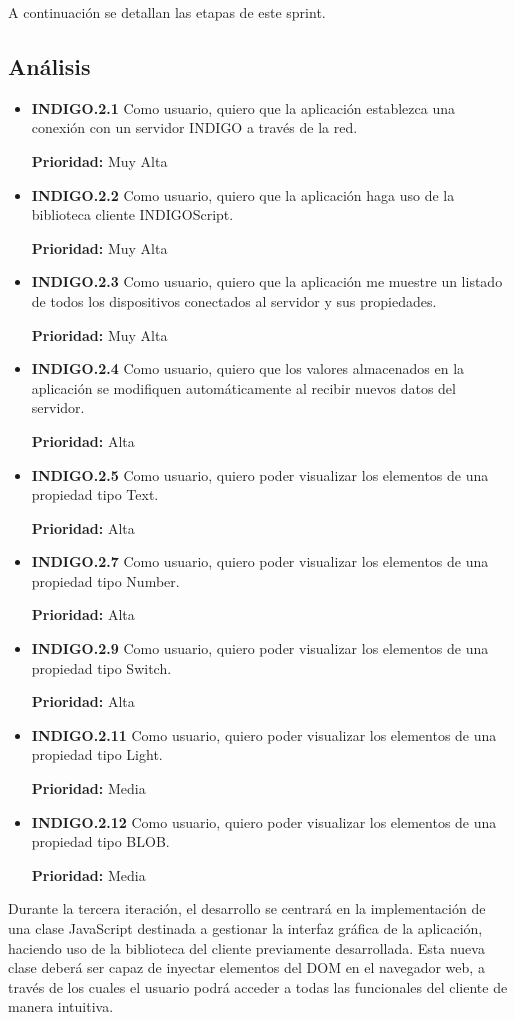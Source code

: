 A continuación se detallan las etapas de este sprint.

\subsection{Análisis}

\begin{itemize}[leftmargin=10mm]
	\item \textbf{INDIGO.2.1 }Como usuario, quiero que la aplicación establezca una conexión con un servidor INDIGO a través de la red.
	
	\textbf{Prioridad:} Muy Alta
	\item \textbf{INDIGO.2.2 }Como usuario, quiero que la aplicación haga uso de la biblioteca cliente INDIGOScript.
	
	\textbf{Prioridad:} Muy Alta
	\item \textbf{INDIGO.2.3 }Como usuario, quiero que la aplicación me muestre un listado de todos los dispositivos conectados al servidor y sus propiedades.
	
	\textbf{Prioridad:} Muy Alta
	\item \textbf{INDIGO.2.4 }Como usuario, quiero que los valores almacenados en la aplicación se modifiquen automáticamente al recibir nuevos datos del servidor.
	
	\textbf{Prioridad:} Alta
	\item \textbf{INDIGO.2.5 }Como usuario, quiero poder visualizar los elementos de una propiedad tipo Text.
	
	\textbf{Prioridad:} Alta
	\item \textbf{INDIGO.2.7 }Como usuario, quiero poder visualizar los elementos de una propiedad tipo Number.
	
	\textbf{Prioridad:} Alta
	\item \textbf{INDIGO.2.9 }Como usuario, quiero poder visualizar los elementos de una propiedad tipo Switch.
	
	\textbf{Prioridad:} Alta
	\item \textbf{INDIGO.2.11 }Como usuario, quiero poder visualizar los elementos de una propiedad tipo Light.
	
	\textbf{Prioridad:} Media
	\item \textbf{INDIGO.2.12 }Como usuario, quiero poder visualizar los elementos de una propiedad tipo BLOB.
	
	\textbf{Prioridad:} Media
\end{itemize}

Durante la tercera iteración, el desarrollo se centrará en la implementación de una clase JavaScript destinada a gestionar la interfaz gráfica de la aplicación, haciendo uso de la biblioteca del cliente previamente desarrollada. Esta nueva clase deberá ser capaz de inyectar elementos del DOM en el navegador web, a través de los cuales el usuario podrá acceder a todas las funcionales del cliente de manera intuitiva.

